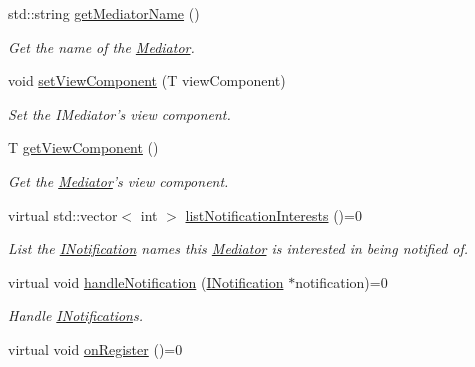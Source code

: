 \begin{DoxyCompactItemize}
\item 
std::string \hyperlink{class_pure_m_v_c_1_1_mediator_aa199b499fc1cfae9b49b8336679787a8}{getMediatorName} ()
\begin{DoxyCompactList}\small\item\em Get the name of the {\ttfamily \hyperlink{class_pure_m_v_c_1_1_mediator}{Mediator}}. \item\end{DoxyCompactList}\item 
void \hyperlink{class_pure_m_v_c_1_1_mediator_a4af88fe9aee0b74198d3d9b73ffe7779}{setViewComponent} (T viewComponent)
\begin{DoxyCompactList}\small\item\em Set the {\ttfamily IMediator}'s view component. \item\end{DoxyCompactList}\item 
T \hyperlink{class_pure_m_v_c_1_1_mediator_aadd3a8ea554fb01f8fcac30592ef0275}{getViewComponent} ()
\begin{DoxyCompactList}\small\item\em Get the {\ttfamily \hyperlink{class_pure_m_v_c_1_1_mediator}{Mediator}}'s view component. \item\end{DoxyCompactList}\item 
virtual std::vector$<$ int $>$ \hyperlink{class_pure_m_v_c_1_1_mediator_a95473998498b3aadf4af81fa8160ead3}{listNotificationInterests} ()=0
\begin{DoxyCompactList}\small\item\em List the {\ttfamily \hyperlink{class_pure_m_v_c_1_1_i_notification}{INotification}} names this {\ttfamily \hyperlink{class_pure_m_v_c_1_1_mediator}{Mediator}} is interested in being notified of. \item\end{DoxyCompactList}\item 
virtual void \hyperlink{class_pure_m_v_c_1_1_mediator_a869785c4f70518e40eaae7395c5f1d48}{handleNotification} (\hyperlink{class_pure_m_v_c_1_1_i_notification}{INotification} $\ast$notification)=0
\begin{DoxyCompactList}\small\item\em Handle {\ttfamily \hyperlink{class_pure_m_v_c_1_1_i_notification}{INotification}}s. \item\end{DoxyCompactList}\item 
virtual void \hyperlink{class_pure_m_v_c_1_1_mediator_a35ee4974b074dbd94b5175968f31379e}{onRegister} ()=0

\end{DoxyCompactItemize}
